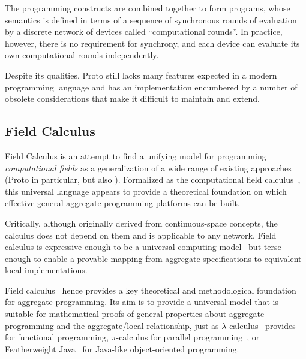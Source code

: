 \documentclass[12pt,a4paper,twoside,openright]{book}
\begin{document}
The programming constructs are combined together to form programs, whose semantics is defined in terms of a sequence of synchronous rounds of evaluation by a discrete network of devices called ``computational rounds''.
%
In practice, however, there is no requirement for synchrony, and each device can evaluate its own computational rounds independently.

Despite its qualities, Proto still lacks many features expected in a modern programming language and has an implementation encumbered by a number of obsolete considerations that make it difficult to maintain and extend.


\cite{proto}

\subsection{Field Calculus}
\label{field-calculus}

Field Calculus is an attempt to find a unifying model for programming \emph{computational fields} as a generalization of a wide range of existing approaches (Proto in particular, but also \cite{mamei2009acm,regiment,VCMZ-TAAS2011,tota2,nagpalphd,yamins,regiment}).
%
Formalized as the computational field calculus~\cite{VDB-FOCLASA-CIC2013}, this universal language appears to provide a theoretical foundation on which effective general aggregate programming platforms can be built.

Critically, although originally derived from continuous-space concepts, the calculus does not depend on them and is applicable to any network.
%
Field calculus is expressive enough to be a universal computing model~\cite{BVD-SCW14} but terse enough to enable a provable mapping from aggregate specifications to equivalent local implementations.

Field calculus~\cite{VDB-FOCLASA-CIC2013} hence provides a key theoretical and methodological foundation for aggregate programming.
%
Its aim is to provide a universal model that is suitable for mathematical proofs of general properties about aggregate programming and the aggregate/local relationship, just as $\lambda$-calculus~\cite{LambdaCalculus} provides for functional programming, $\pi$-calculus for parallel programming~\cite{PiCalculus}, or Featherweight Java~\cite{FJ} for Java-like object-oriented programming.
\end{document}
